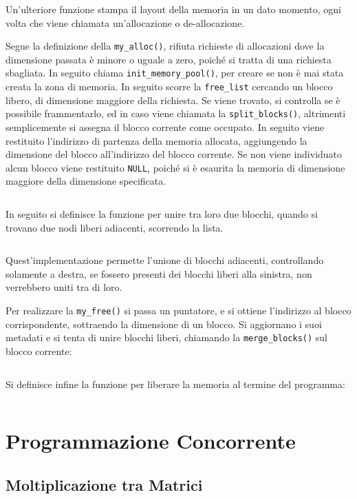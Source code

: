 \documentclass{article}
\numberwithin{equation}{subsection}
\begin{document}
Un'ulteriore funzione stampa il layout della memoria in un dato momento, ogni volta che viene 
chiamata un'allocazione o de-allocazione. 

Segue la definizione della \verb|my_alloc()|, rifiuta richieste di allocazioni dove la dimensione passata è minore o uguale a zero, poiché si tratta di una richiesta sbagliata. In seguito chiama \verb|init_memory_pool()|, per creare se non è mai stata creata la zona di memoria. 
In seguito scorre la \verb|free_list| cercando un blocco libero, di dimensione maggiore della richiesta. Se viene trovato, si controlla se è possibile frammentarlo, ed in caso viene chiamata la \verb|split_blocks()|, altrimenti semplicemente si assegna il blocco corrente come occupato. 
In seguito viene restituito l'indirizzo di partenza della memoria allocata, aggiungendo la dimensione del blocco all'indirizzo del blocco corrente. 
Se non viene individuato alcun blocco viene restituito \verb|NULL|, poiché si è esaurita la memoria di dimensione maggiore della dimensione specificata. 
\inputminted[firstline=70,lastline=89]{c}{./"Esercitazione del 19-11-24"/domanda4.c}

In seguito si definisce la funzione per unire tra loro due blocchi, quando si trovano due nodi 
liberi adiacenti, scorrendo la lista. 
\inputminted[firstline=91,lastline=96]{c}{./"Esercitazione del 19-11-24"/domanda4.c}
Quest'implementazione permette l'unione di blocchi adiacenti, controllando solamente a destra, se fossero presenti dei blocchi liberi alla sinistra, non verrebbero uniti tra di loro. 


Per realizzare la \verb|my_free()| si passa un puntatore, e si ottiene l'indirizzo al blocco corrispondente, sottraendo la dimensione di un blocco. Si aggiornano i suoi metadati e si tenta di unire blocchi liberi, chiamando la \verb|merge_blocks()| sul blocco corrente:
\inputminted[firstline=98,lastline=107]{c}{./"Esercitazione del 19-11-24"/domanda4.c}

Si definisce infine la funzione per liberare la memoria al termine del programma:
\inputminted[firstline=109,lastline=116]{c}{./"Esercitazione del 19-11-24"/domanda4.c}

\clearpage

\section{Programmazione Concorrente}

\subsection{Moltiplicazione tra Matrici}
\end{document}
